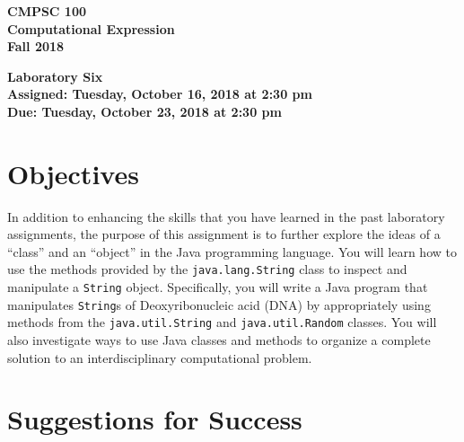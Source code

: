 \documentclass[11pt]{article}
\newcommand{\assignmentduedate}{October 23}
\newcommand{\assignmentassignedate}{October 16}
\newcommand{\assignmentnumber}{Six}
\newcommand{\labyear}{2018}
\newcommand{\labday}{Tuesday}
\newcommand{\labtime}{2:30 pm}
\newcommand{\assigneddate}{Assigned: \labday, \assignmentassignedate, \labyear{} at \labtime{}}
\newcommand{\duedate}{Due: \labday, \assignmentduedate, \labyear{} at \labtime{}}
\newcommand{\labtitle}[1]
{
  \begin{center}
    \begin{center}
      \bf
      CMPSC 100\\Computational Expression\\
      Fall 2018\\
      \medskip
    \end{center}
    \bf
    #1
  \end{center}
}
\begin{document}
\thispagestyle{empty}

\labtitle{Laboratory \assignmentnumber{} \\ \assigneddate{} \\ \duedate{}}

\section*{Objectives}

In addition to enhancing the skills that you have learned in the past laboratory
assignments, the purpose of this assignment is to further explore the ideas of a
``class'' and an ``object'' in the Java programming language. You will learn how
to use the methods provided by the {\tt java.lang.String} class to inspect and
manipulate a {\tt String} object. Specifically, you will write a Java program
that manipulates {\tt String}s of Deoxyribonucleic acid (DNA) by appropriately
using methods from the {\tt java.util.String} and {\tt java.util.Random}
classes. You will also investigate ways to use Java classes and methods to
organize a complete solution to an interdisciplinary computational problem.

\section*{Suggestions for Success}
\end{document}
